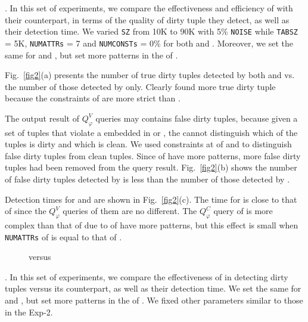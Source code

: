 . In this set of experiments, we compare the effectiveness and efficiency of \pCFD with their \CFD counterpart, in terms of the quality of dirty tuple they detect, as well as their detection time. We varied \texttt{SZ} from 10K to 90K with 5\% \texttt{NOISE} while \texttt{TABSZ} = 5K, \texttt{NUMATTRs} = 7 and \texttt{NUMCONSTs} = 0\% for both \pCFDs and \CFDs. Moreover, we set the same \LHS for \pCFDs and \pCINDs, but set more patterns in the \RHS of \pCFDs.

Fig.~\ref{fig2}(a) presents the number of true dirty tuples detected by both \pCFDs and \CFDs vs. the number of those detected by \pCFDs only. Clearly \pCFDs found more true dirty tuple because the constraints of \pCFDs are more strict than \CFDs.

The output result of $Q_\varphi^V$ queries may contains false dirty tuples, because given a set of tuples that violate a \FD embedded in \pCFDs or \CFDs, the \FD cannot distinguish which of the tuples is dirty and which is clean. We used constraints at \RHS of \pCFDs and \CFDs to distinguish false dirty tuples from clean tuples. Since \RHS of \pCFDs have more patterns, more false dirty tuples had been removed from the query result. Fig.~\ref{fig2}(b) shows the number of false dirty tuples detected by \pCFDs is less than the number of those detected by \CFDs.

Detection times for \pCFDs and \CFDs are shown in Fig.~\ref{fig2}(c). The time for \pCFDs is close to that of \CFDs since the $Q_\varphi^V$ queries of them are no different. The $Q_\varphi^C$ query of \pCFD is more complex than that of \CFD due to \RHS of \pCFDs have more patterns, but this effect is small when \texttt{NUMATTRs} of \pCFDs is equal to that of \CFDs.

\begin{figure*}
  \centering
  \caption{\pCINDs versus \CINDs}\label{fig3}
\end{figure*}

. In this set of experiments, we compare the effectiveness of \pCIND in detecting dirty tuples versus its \CIND counterpart, as well as their detection time. We set the same \RHS for \pCINDs and \CINDs, but set more patterns in the \LHS of \pCINDs. We fixed other parameters similar to those in the Exp-2.

